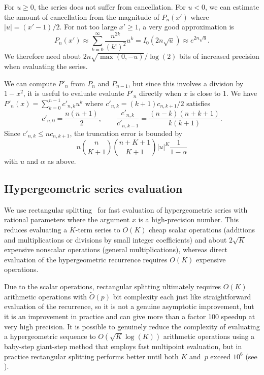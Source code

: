 \documentclass[11pt,a4paper]{article}
\begin{document}
For $u \ge 0$, the series does not suffer from cancellation.
For $u < 0$, we can estimate the amount of
cancellation from the magnitude of $P_n(x')$ where $|u| = (x'-1)/2$.
For not too large $x' \ge 1$, a very good approximation is
$$P_n(x') \approx \sum_{k=0}^{\infty} \frac{n^{2k}}{(k!)^2} u^k = I_0(2n\sqrt{u}) \approx e^{2n\sqrt{u}}.$$
We therefore need about $2n\sqrt{\max(0,-u)} / \log(2)$ bits
of increased precision when evaluating the series.

We can compute $P'_n$ from $P_n$ and $P_{n-1}$, but since this
involves a division by $1-x^2$, it is useful to evaluate
evaluate $P'_n$ directly when $x$ is close to 1.
We have
$P'_n(x) = \sum_{k=0}^{n-1} c'_{n,k} u^k$
where $c'_{n,k} = (k+1) c_{n,k+1} / 2$ satisfies
\[
  c'_{n,0} = \frac{n(n+1)}{2}, \qquad
  \frac{c'_{n,k}}{c'_{n,k-1}} = \frac{(n-k)(n+k+1)}{k(k+1)}.
\]
Since $c'_{n,k} \le n c_{n,k+1}$, the truncation error is bounded by
\begin{equation}
\label{eq:truncerr2b}
n {n \choose K+1}{n+K+1 \choose K+1} |u|^K \frac{1}{1-\alpha}
\end{equation}
with $u$ and $\alpha$ as above.

\subsection{Hypergeometric series evaluation}

\label{sec:serieseval}

We use rectangular splitting~\cite{Smith1989,Johansson2014rectangular}
for fast evaluation of hypergeometric series with
rational parameters where the argument $x$ is a high-precision number.
This reduces evaluating a $K$-term series to
$O(K)$ cheap scalar operations (additions and multiplications or divisions
by small integer coefficients)
and about $2\sqrt{K}$ expensive nonscalar operations (general multiplications),
whereas direct evaluation of the hypergeometric
recurrence requires $O(K)$ expensive operations.

Due to the scalar operations, rectangular splitting ultimately
requires $O(K)$ arithmetic operations with $\widetilde{O}(p)$ bit complexity
each
just like straightforward evaluation of the recurrence, so it is
not a genuine asymptotic improvement, but
it is an improvement in practice and
can give more than a factor 100 speedup at very high precision.
It is possible to genuinely reduce the complexity of evaluating
a hypergeometric sequence to $O(\sqrt{K} \log(K))$ arithmetic
operations using a baby-step giant-step method
that employs fast multipoint evaluation,
but in practice rectangular splitting
performs better until both $K$ and~$p$
exceed $10^6$ (see \cite{Johansson2014rectangular}).
\end{document}
